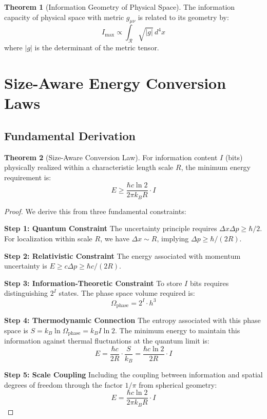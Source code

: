 \documentclass[11pt,a4paper]{article}
\theoremstyle{definition}
\newtheorem{theorem}{Theorem}[section]
\begin{document}
\begin{theorem}[Information Geometry of Physical Space]
The information capacity of physical space with metric $g_{\mu\nu}$ is related to its geometry by:
\begin{equation}
I_{\text{max}} \propto \int_{\mathcal{R}} \sqrt{|g|} \, d^4x
\end{equation}
where $|g|$ is the determinant of the metric tensor.
\end{theorem}

\section{Size-Aware Energy Conversion Laws}

\subsection{Fundamental Derivation}

\begin{theorem}[Size-Aware Conversion Law]
\label{thm:size-aware}
For information content $I$ (bits) physically realized within a characteristic length scale $R$, the minimum energy requirement is:
\begin{equation}
E \geq \frac{\hbar c \ln 2}{2\pi k_B R} \cdot I
\end{equation}
\end{theorem}

\begin{proof}
We derive this from three fundamental constraints:

\textbf{Step 1: Quantum Constraint}
The uncertainty principle requires $\Delta x \Delta p \geq \hbar/2$. For localization within scale $R$, we have $\Delta x \sim R$, implying $\Delta p \geq \hbar/(2R)$.

\textbf{Step 2: Relativistic Constraint}
The energy associated with momentum uncertainty is $E \geq c\Delta p \geq \hbar c/(2R)$.

\textbf{Step 3: Information-Theoretic Constraint}
To store $I$ bits requires distinguishing $2^I$ states. The phase space volume required is:
\begin{equation}
\Omega_{\text{phase}} = 2^I \cdot h^3
\end{equation}

\textbf{Step 4: Thermodynamic Connection}
The entropy associated with this phase space is $S = k_B \ln \Omega_{\text{phase}} = k_B I \ln 2$. The minimum energy to maintain this information against thermal fluctuations at the quantum limit is:
\begin{equation}
E = \frac{\hbar c}{2R} \cdot \frac{S}{k_B} = \frac{\hbar c \ln 2}{2R} \cdot I
\end{equation}

\textbf{Step 5: Scale Coupling}
Including the coupling between information and spatial degrees of freedom through the factor $1/\pi$ from spherical geometry:
\begin{equation}
E = \frac{\hbar c \ln 2}{2\pi k_B R} \cdot I
\end{equation}
\end{proof}
\end{document}
